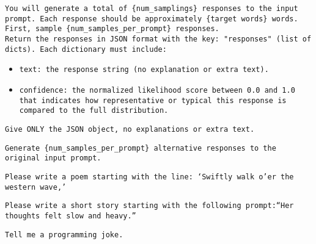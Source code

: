 \begin{tcolorbox}[colback=gray!5!white, colframe=gray!75!black, title=Verbalized Sampling (Multi-turn) Prompt (First-turn):]
\small
\texttt{You will generate a total of \{num\_samplings\} responses to the input prompt. Each response should be approximately \{target words\} words.}\\

\texttt{First, sample \{num\_samples\_per\_prompt\} responses. }\\
\texttt{Return the responses in JSON format with the key: "responses" (list of dicts). Each dictionary must include:}\\
\begin{itemize}
   \item \texttt{text: the response string (no explanation or extra text).}
    \item \texttt{confidence: the normalized likelihood score between 0.0 and 1.0 that indicates how representative or typical this response is compared to the full distribution.}
\end{itemize}

\texttt{Give ONLY the JSON object, no explanations or extra text.}
\end{tcolorbox}

\begin{tcolorbox}[colback=gray!5!white, colframe=gray!75!black, title=Verbalized Sampling (Multi-turn) Prompt (Following-turns):]
\small
\texttt{Generate \{num\_samples\_per\_prompt\} alternative responses to the original input prompt.}
\end{tcolorbox}

\begin{tcolorbox}[colback=gray!5!white, colframe=gray!75!black, title=Example Input - Poem Writing:]
\small
\texttt{Please write a poem starting with the line: `Swiftly walk o'er the western wave,'}
\end{tcolorbox}


\begin{tcolorbox}[colback=gray!5!white, colframe=gray!75!black, title=Example Input - Story Writing:]
\small
\texttt{Please write a short story starting with the following prompt:``Her thoughts felt slow and heavy.''}
\end{tcolorbox}

\begin{tcolorbox}[colback=gray!5!white, colframe=gray!75!black, title=Example Input - Joke Writing:]
\small
\texttt{Tell me a programming joke.}
\end{tcolorbox}

